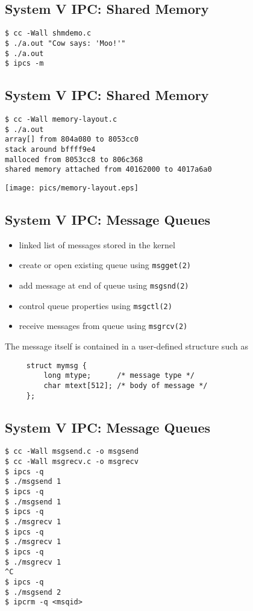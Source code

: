 \documentclass[xga]{xdvislides}
\begin{document}
\subsection{System V IPC: Shared Memory}
\begin{verbatim}
$ cc -Wall shmdemo.c
$ ./a.out "Cow says: 'Moo!'"
$ ./a.out
$ ipcs -m
\end{verbatim}

\subsection{System V IPC: Shared Memory}
\begin{verbatim}
$ cc -Wall memory-layout.c
$ ./a.out
array[] from 804a080 to 8053cc0
stack around bffff9e4
malloced from 8053cc8 to 806c368
shared memory attached from 40162000 to 4017a6a0
\end{verbatim}
\begin{center}
	\texttt{[image: pics/memory-layout.eps]}
\end{center}

\subsection{System V IPC: Message Queues}
\begin{itemize}
	\item linked list of messages stored in the kernel
	\item create or open existing queue using {\tt msgget(2)}
	\item add message at end of queue using {\tt msgsnd(2)}
	\item control queue properties using {\tt msgctl(2)}
	\item receive messages from queue using {\tt msgrcv(2)}
\end{itemize}
\vspace{.5in}
The message itself is contained in a user-defined structure such as
\begin{verbatim}
     struct mymsg {
         long mtype;      /* message type */
         char mtext[512]; /* body of message */
     };
\end{verbatim}

\subsection{System V IPC: Message Queues}
\begin{verbatim}
$ cc -Wall msgsend.c -o msgsend
$ cc -Wall msgrecv.c -o msgrecv
$ ipcs -q
$ ./msgsend 1
$ ipcs -q
$ ./msgsend 1
$ ipcs -q
$ ./msgrecv 1
$ ipcs -q
$ ./msgrecv 1
$ ipcs -q
$ ./msgrecv 1
^C
$ ipcs -q
$ ./msgsend 2
$ ipcrm -q <msqid>
\end{verbatim}
\end{document}
